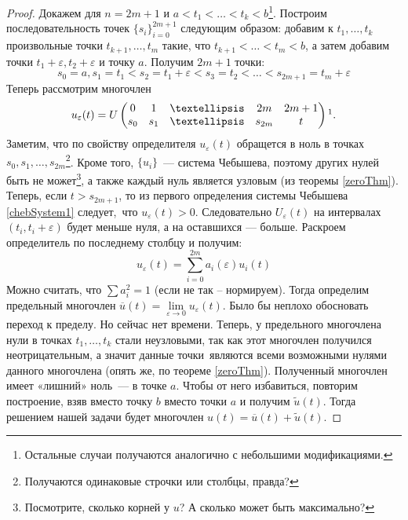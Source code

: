 \begin{proof}
Докажем для $n=2m+1$ и $a < t_1 < … < t_k < b$\footnote{Остальные случаи получаются аналогично с небольшими модификациями.}. Построим 
последовательность точек $\{s_i\}_{i=0}^{2m+1}$ следующим образом: добавим к $t_1,…, t_k$ произвольные точки $t_{k+1}, …, t_{m}$ такие, что $t_{k+1} < … < t_{m} < b$,  а затем добавим точки $t_1+\varepsilon, t_2 + \varepsilon$ и точку $a$. Получим $2m+1$ точки:
$$ s_0 = a, s_1=t_1 < s_2 = t_1 + \varepsilon < s_3 = t_2 < … < s_{2m+1} = t_{m}+\varepsilon$$
Теперь рассмотрим многочлен 
$$u_{\varepsilon}(t) = 
    U\begin{pmatrix}
        0 & 1 & … & 2m & 2m+1 \\
        s_0 & s_1 & … & s_{2m}& t\\
    \end{pmatrix}\footnotemark.
$$
Заметим, что по свойству определителя $u_{\varepsilon}(t)$ обращется в ноль в точках $s_0, s_1, …, s_{2m}$\footnote{Получаются одинаковые строчки
или столбцы, правда?}.
Кроме того, $\{u_i\}$ — система Чебышева, поэтому других нулей быть не может\footnote{Посмотрите, сколько корней у $u$? А сколько может быть максимально?}, 
а также каждый нуль является узловым (из теоремы \eqref{zeroThm}). Теперь, если $t > s_{2m+1}$, то из первого определения системы Чебышева \eqref{chebSystem1} следует, что $u_{\varepsilon}(t) > 0$. Следовательно $U_\varepsilon(t)$ на интервалах $(t_i, t_i+\varepsilon)$ будет меньше нуля, а на оставшихся — больше. Раскроем определитель по последнему столбцу и получим:
$$ u_\varepsilon(t) = \sum\limits_{i=0}^{2m} a_i(\varepsilon)u_i(t)$$
Можно считать, что $\sum a_i^2 = 1$ (если не так – нормируем). Тогда определим предельный многочлен $\overline{u}(t) = \lim \limits_{\varepsilon \rightarrow 0} u_\varepsilon(t)$.
{\color{blue} Было бы неплохо обосновать переход к пределу. Но сейчас нет времени.}
Теперь, у предельного многочлена нули в точках $t_1, …, t_k$ стали неузловыми, так как этот многочлен получился неотрицательным,
а значит данные точки являются всеми возможными нулями данного многочлена (опять же, по теореме \eqref{zeroThm}). Полученный многочлен имеет «лишний» ноль — в точке $a$. Чтобы от него избавиться, повторим построение, взяв вместо точку $b$ вместо точки $a$ и получим $\tilde{u}(t)$. Тогда решением нашей задачи будет многочлен
$u(t) = \overline{u}(t) + \tilde{u}(t)$.
\end{proof}
